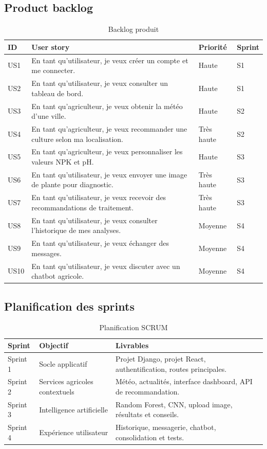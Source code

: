 \documentclass[12pt,a4paper]{report}
\begin{document}
\subsection{Product backlog}
\begin{longtable}{p{1cm}p{8.5cm}p{2.2cm}p{2.2cm}}
\caption{Backlog produit}\\
\toprule
\textbf{ID} & \textbf{User story} & \textbf{Priorité} & \textbf{Sprint} \\
\midrule
US1 & En tant qu'utilisateur, je veux créer un compte et me connecter. & Haute & S1 \\
US2 & En tant qu'utilisateur, je veux consulter un tableau de bord. & Haute & S1 \\
US3 & En tant qu'agriculteur, je veux obtenir la météo d'une ville. & Haute & S2 \\
US4 & En tant qu'agriculteur, je veux recommander une culture selon ma localisation. & Très haute & S2 \\
US5 & En tant qu'agriculteur, je veux personnaliser les valeurs NPK et pH. & Haute & S3 \\
US6 & En tant qu'utilisateur, je veux envoyer une image de plante pour diagnostic. & Très haute & S3 \\
US7 & En tant qu'utilisateur, je veux recevoir des recommandations de traitement. & Très haute & S3 \\
US8 & En tant qu'utilisateur, je veux consulter l'historique de mes analyses. & Moyenne & S4 \\
US9 & En tant qu'utilisateur, je veux échanger des messages. & Moyenne & S4 \\
US10 & En tant qu'utilisateur, je veux discuter avec un chatbot agricole. & Moyenne & S4 \\
\bottomrule
\end{longtable}

\subsection{Planification des sprints}
\begin{table}[H]
\centering
\caption{Planification SCRUM}
\begin{tabular}{p{2cm}p{5.5cm}p{6cm}}
\toprule
\textbf{Sprint} & \textbf{Objectif} & \textbf{Livrables} \\
\midrule
Sprint 1 & Socle applicatif & Projet Django, projet React, authentification, routes principales. \\
Sprint 2 & Services agricoles contextuels & Météo, actualités, interface dashboard, API de recommandation. \\
Sprint 3 & Intelligence artificielle & Random Forest, CNN, upload image, résultats et conseils. \\
Sprint 4 & Expérience utilisateur & Historique, messagerie, chatbot, consolidation et tests. \\
\bottomrule
\end{tabular}
\end{table}
\end{document}
